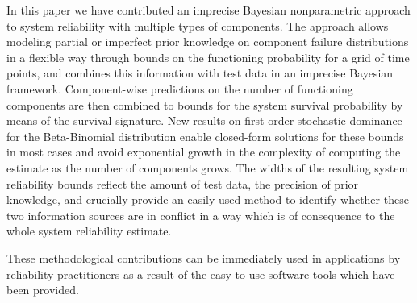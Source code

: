 \documentclass[12pt, a4paper]{elsarticle}
\begin{document}
In this paper we have contributed an imprecise Bayesian nonparametric approach
to system reliability with multiple types of components.
The approach allows modeling partial or imperfect prior knowledge on component failure distributions
in a flexible way through bounds on the functioning probability for a grid of time points, 
and combines this information with test data in an imprecise Bayesian framework.
Component-wise predictions on the number of functioning components
are then combined to bounds for the system survival probability by means of the survival signature.
New results on first-order stochastic dominance for the Beta-Binomial distribution
enable closed-form solutions for these bounds in most cases and 
avoid exponential growth in the complexity of computing the estimate
as the number of components grows.
The widths of the resulting system reliability bounds
reflect the amount of test data, the precision of prior knowledge,
and crucially provide an easily used method to identify 
whether these two information sources are in conflict in a
way which is of consequence to the whole system reliability
estimate.

These methodological contributions can be immediately used in
applications by reliability practitioners as a result of the 
easy to use software tools which have been provided.
\end{document}
